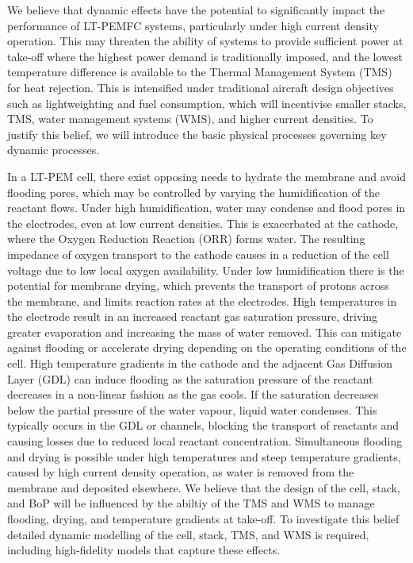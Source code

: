 We believe that dynamic effects have the potential to significantly impact the performance of LT-PEMFC systems, particularly under high current density operation.
This may threaten the ability of systems to provide sufficient power at take-off where the highest power demand is traditionally imposed, and the lowest temperature difference is available to the Thermal Management System (TMS) for heat rejection.
This is intensified under  traditional aircraft design objectives such as lightweighting and fuel consumption, which will incentivise smaller stacks, TMS, water management systems (WMS), and higher current densities.
To justify this belief, we will introduce the basic physical processes governing key dynamic processes.

In a LT-PEM cell, there exist opposing needs to hydrate the membrane and avoid flooding pores, which may be controlled by varying the humidification of the reactant flows.
Under high humidification, water may condense and flood pores in the electrodes, even at low current densities.
This is exacerbated at the cathode, where the Oxygen Reduction Reaction (ORR) forms water.
The resulting impedance of oxygen transport to the cathode causes in a reduction of the cell voltage due to low local oxygen availability.
Under low humidification there is the potential for membrane drying, which prevents the transport of protons across the membrane, and limits reaction rates at the electrodes.
High temperatures in the electrode result in an increased reactant gas saturation pressure, driving greater evaporation and increasing the mass of water removed.
This can mitigate against flooding or accelerate drying depending on the operating conditions of the cell.
High temperature gradients in the cathode and the adjacent Gas Diffusion Layer (GDL) can induce flooding as the saturation pressure of the reactant decreases in a non-linear fashion as the gas cools.
If the saturation decreases below the partial pressure of the water vapour, liquid water condenses.
This typically occurs in the GDL or channels, blocking the transport of reactants and causing losses due to reduced local reactant concentration.
Simultaneous flooding and drying is possible under high temperatures and steep temperature gradients, caused by high current density operation, as water is removed from the membrane and deposited elsewhere.
We believe that the design of the cell, stack, and BoP will be influenced by the abiltiy of the TMS and WMS to manage flooding, drying, and temperature gradients at take-off.
To investigate this belief detailed dynamic modelling of the cell, stack, TMS, and WMS is required, including high-fidelity models that capture these effects.

